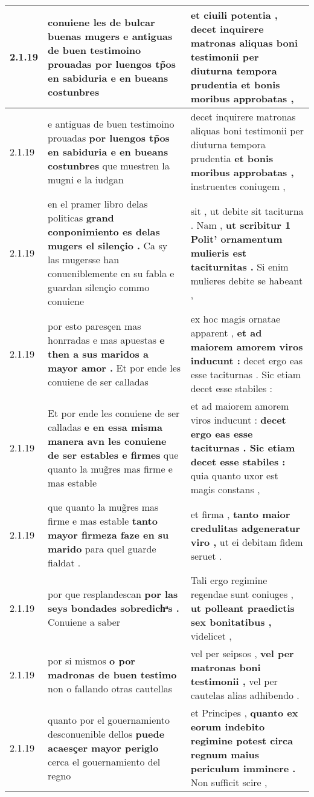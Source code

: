 \begin{tabular}{|p{1cm}|p{6.5cm}|p{6.5cm}|}
2.1.19 & conuiene les de bulcar buenas mugers \textbf{ e antiguas de buen testimoino prouadas } por luengos tp̃os en sabiduria e en bueans costunbres & et ciuili potentia , \textbf{ decet inquirere matronas aliquas boni testimonii per diuturna tempora prudentia } et bonis moribus approbatas , \\\hline
2.1.19 & e antiguas de buen testimoino prouadas \textbf{ por luengos tp̃os en sabiduria e en bueans costunbres } que muestren la mugni e la iudgan & decet inquirere matronas aliquas boni testimonii per diuturna tempora prudentia \textbf{ et bonis moribus approbatas , } instruentes coniugem , \\\hline
2.1.19 & en el pramer libro delas politicas \textbf{ grand conponimiento es delas mugers el silençio . } Ca sy las mugersse han conueniblemente en su fabla e guardan silençio commo conuiene & sit , ut debite sit taciturna . Nam , \textbf{ ut scribitur 1 Polit’ ornamentum mulieris est taciturnitas . } Si enim mulieres debite se habeant , \\\hline
2.1.19 & por esto paresçen mas honrradas e mas apuestas \textbf{ e then a sus maridos a mayor amor . } Et por ende les conuiene de ser calladas & ex hoc magis ornatae apparent , \textbf{ et ad maiorem amorem viros inducunt : } decet ergo eas esse taciturnas . Sic etiam decet esse stabiles : \\\hline
2.1.19 & Et por ende les conuiene de ser calladas \textbf{ e en essa misma manera avn les conuiene de ser estables e firmes } que quanto la mug̃res mas firme e mas estable & et ad maiorem amorem viros inducunt : \textbf{ decet ergo eas esse taciturnas . Sic etiam decet esse stabiles : } quia quanto uxor est magis constans , \\\hline
2.1.19 & que quanto la mug̃res mas firme e mas estable \textbf{ tanto mayor firmeza faze en su marido } para quel guarde fialdat . & et firma , \textbf{ tanto maior credulitas adgeneratur viro , } ut ei debitam fidem seruet . \\\hline
2.1.19 & por que resplandescan \textbf{ por las seys bondades sobredichͣs . } Conuiene a saber & Tali ergo regimine regendae sunt coniuges , \textbf{ ut polleant praedictis sex bonitatibus , } videlicet , \\\hline
2.1.19 & por si mismos \textbf{ o por madronas de buen testimo } non o fallando otras cautellas & vel per seipsos , \textbf{ vel per matronas boni testimonii , } vel per cautelas alias adhibendo . \\\hline
2.1.19 & quanto por el gouernamiento desconuenible dellos \textbf{ puede acaesçer mayor periglo } cerca el gouernamiento del regno & et Principes , \textbf{ quanto ex eorum indebito regimine potest circa regnum maius periculum imminere . } Non sufficit scire , \\\hline

\end{tabular}
